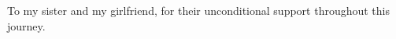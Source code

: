 \begin{dedication}

To my sister and my girlfriend, for their unconditional support throughout this journey.
\newpage

\end{dedication}
